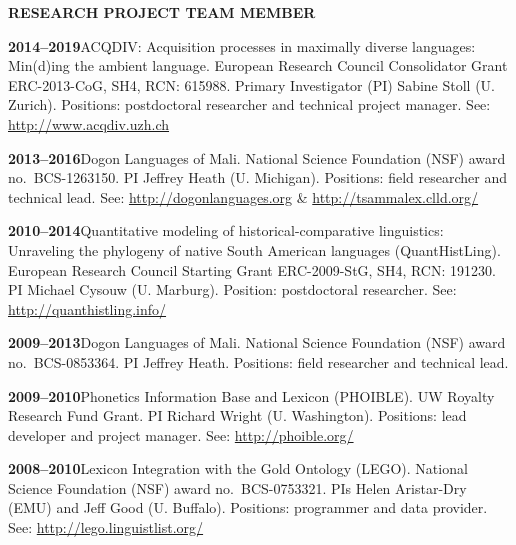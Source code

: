 \documentclass[11pt]{article}
\newcommand{\hangpara}{
 \setlength{\parindent}{0in} %
 \hangindent=0.42in %
}
\begin{document}
\vskip 20pt
\begin{flushleft}
{\bf RESEARCH PROJECT TEAM MEMBER}
\end{flushleft}


\hangpara
{\bf 2014--2019}\hspace{1ex}ACQDIV: Acquisition processes in maximally diverse languages: Min(d)ing the ambient language. European Research Council Consolidator Grant ERC-2013-CoG, SH4, RCN: 615988. Primary Investigator (PI) Sabine Stoll (U. Zurich). Positions: postdoctoral researcher and technical project manager. See: \url{http://www.acqdiv.uzh.ch}

\vskip 6pt
\hangpara
{\bf 2013--2016}\hspace{1ex}Dogon Languages of Mali. National Science Foundation (NSF) award no.\ BCS-1263150. PI Jeffrey Heath (U. Michigan). Positions: field researcher and technical lead. See: \url{http://dogonlanguages.org} \& \url{http://tsammalex.clld.org/}

\vskip 6pt
\hangpara
{\bf 2010--2014}\hspace{1ex}Quantitative modeling of historical-comparative linguistics: Unraveling the phylogeny of native South American languages (QuantHistLing). European Research Council Starting Grant ERC-2009-StG, SH4, RCN: 191230. PI Michael Cysouw (U. Marburg). Position: postdoctoral researcher. See: \url{http://quanthistling.info/}

\vskip 6pt
\hangpara
{\bf 2009--2013}\hspace{1ex}Dogon Languages of Mali. National Science Foundation (NSF) award no.\ BCS-0853364. PI Jeffrey Heath. Positions: field researcher and technical lead.

\vskip 6pt
\hangpara
{\bf 2009--2010}\hspace{1ex}Phonetics Information Base and Lexicon (PHOIBLE). UW Royalty Research Fund Grant. PI Richard Wright (U. Washington). Positions: lead developer and project manager. See: \url{http://phoible.org/}

\vskip 6pt
\hangpara
{\bf 2008--2010}\hspace{1ex}Lexicon Integration with the Gold Ontology (LEGO). National Science Foundation (NSF) award no.\ BCS-0753321. PIs Helen Aristar-Dry (EMU) and Jeff Good (U. Buffalo). Positions: programmer and data provider. See: \url{http://lego.linguistlist.org/}
\end{document}
